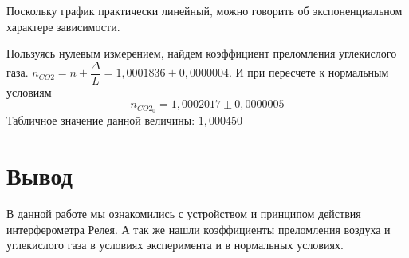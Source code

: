 Поскольку график практически линейный, можно говорить об экспоненциальном характере зависимости.

Пользуясь нулевым измерением, найдем коэффициент преломления углекислого газа. $n_{CO2} = n + \dfrac{\Delta}{L} = 1,0001836 \pm 0,0000004$. И при пересчете к нормальным условиям
\[
	n_{CO2_0} = 1,0002017 \pm 0,0000005
\]
Табличное значение данной величины: $1,000450$

\section{Вывод}

В данной работе мы ознакомились с устройством и принципом действия интерферометра Релея. А так же нашли коэффициенты преломления воздуха и углекислого газа в условиях эксперимента и в нормальных условиях.

